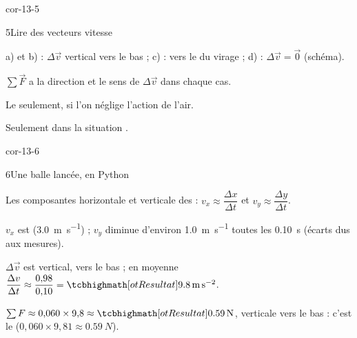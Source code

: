 \begin{blocLivre}{cor-13-5}
\begin{corrige}{5}{Lire des vecteurs vitesse}
\begin{questions}
\item a) et b) : $\Delta\vec{v}$ vertical vers le bas ; c) : vers le  du virage ; d) : $\Delta\vec{v}=\vec{0}$ (schéma).
\item $\sum\vec{F}$ a la direction et le sens de $\Delta\vec{v}$ dans chaque cas.
\item Le  seulement, si l'on néglige l'action de l'air.
\item Seulement dans la situation .
\end{questions}
\end{corrige}
\end{blocLivre}
\begin{blocLivre}{cor-13-6}
\begin{corrige}{6}{Une balle lancée, en Python}
\begin{questions}
\item Les composantes horizontale et verticale des  : $v_x\approx\dfrac{\Delta x}{\Delta t}$ et $v_y\approx\dfrac{\Delta y}{\Delta t}$.
\item $v_x$ est  (\qty{3,0}{m.s^{-1}}) ; $v_y$ diminue d'environ \qty{1,0}{m.s^{-1}} toutes les \qty{0,10}{s} (écarts dus aux mesures).
\item $\Delta\vec{v}$ est vertical, vers le bas ; en moyenne $\dfrac{\Delta v}{\Delta t}\approx\dfrac{0{,}98}{0{,}10}=\res{\qty{9,8}{m.s^{-2}}}$.
\item $\sum F\approx0{,}060\times9{,}8\approx\res{\qty{0,59}{N}}$, verticale vers le bas : c'est le  ($0{,}060\times9{,}81\approx\qty{0,59}{N}$).
\end{questions}
\end{corrige}
\end{blocLivre}
